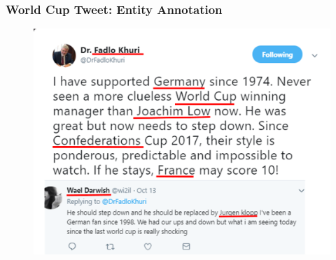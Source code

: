 \documentclass[xcolor=table]{beamer}
\begin{document}
%
%

\begin{frame}
\frametitle{World Cup Tweet: Entity Annotation }
\begin{figure}[!htb]
   \centering
    \includegraphics[scale=0.5]{img0004_1.png}
    
\end{figure}

\end{frame}
\end{document}
